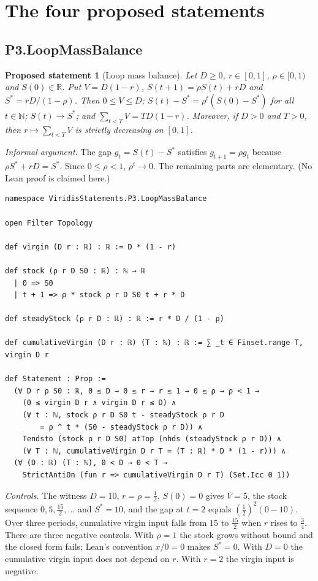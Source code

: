 \documentclass[11pt]{article}
\newtheorem{proposal}{Proposed statement}
\theoremstyle{remark}
\begin{document}
\section{The four proposed statements}
\label{sec:statements}

\subsection{P3.LoopMassBalance}
\begin{proposal}[Loop mass balance]
Let $D\ge0$, $r\in[0,1]$, $\rho\in[0,1)$ and $S(0)\in\mathbb{R}$. Put $V=D(1-r)$,
$S(t+1)=\rho S(t)+rD$ and $S^\ast=rD/(1-\rho)$. Then $0\le V\le D$;
$S(t)-S^\ast=\rho^t(S(0)-S^\ast)$ for all $t\in\mathbb{N}$; $S(t)\to S^\ast$; and
$\sum_{t<T}V = TD(1-r)$. Moreover, if $D>0$ and $T>0$, then $r\mapsto\sum_{t<T}V$ is strictly
decreasing on $[0,1]$.
\end{proposal}
\emph{Informal argument.} The gap $g_t = S(t)-S^\ast$ satisfies $g_{t+1}=\rho g_t$ because
$\rho S^\ast + rD = S^\ast$. Since $0\le\rho<1$, $\rho^t\to0$. The remaining parts are
elementary. (No Lean proof is claimed here.)

\begin{lstlisting}[caption={Core of \texttt{proposals/P3.LoopMassBalance.lean} (docstrings omitted; \texttt{nhds} is the name behind Mathlib's $\mathcal{N}$ notation used in the file).}]
namespace ViridisStatements.P3.LoopMassBalance

open Filter Topology

def virgin (D r : ℝ) : ℝ := D * (1 - r)

def stock (ρ r D S0 : ℝ) : ℕ → ℝ
  | 0 => S0
  | t + 1 => ρ * stock ρ r D S0 t + r * D

def steadyStock (ρ r D : ℝ) : ℝ := r * D / (1 - ρ)

def cumulativeVirgin (D r : ℝ) (T : ℕ) : ℝ := ∑ _t ∈ Finset.range T, virgin D r

def Statement : Prop :=
  (∀ D r ρ S0 : ℝ, 0 ≤ D → 0 ≤ r → r ≤ 1 → 0 ≤ ρ → ρ < 1 →
    (0 ≤ virgin D r ∧ virgin D r ≤ D) ∧
    (∀ t : ℕ, stock ρ r D S0 t - steadyStock ρ r D
        = ρ ^ t * (S0 - steadyStock ρ r D)) ∧
    Tendsto (stock ρ r D S0) atTop (nhds (steadyStock ρ r D)) ∧
    (∀ T : ℕ, cumulativeVirgin D r T = (T : ℝ) * D * (1 - r))) ∧
  (∀ (D : ℝ) (T : ℕ), 0 < D → 0 < T →
    StrictAntiOn (fun r => cumulativeVirgin D r T) (Set.Icc 0 1))
\end{lstlisting}

\emph{Controls.} The witness $D=10$, $r=\rho=\tfrac12$, $S(0)=0$ gives $V=5$, the stock sequence
$0,5,\tfrac{15}{2},\dots$ and $S^\ast=10$, and the gap at $t=2$ equals
$(\tfrac12)^2(0-10)$. Over three periods, cumulative virgin input falls from $15$ to $\tfrac{15}{2}$
when $r$ rises to $\tfrac34$. There are three negative controls. With $\rho=1$ the stock grows
without bound and the closed form fails; Lean's convention $x/0=0$ makes $S^\ast=0$. With $D=0$
the cumulative virgin input does not depend on $r$. With $r=2$ the virgin input is negative.
\end{document}
